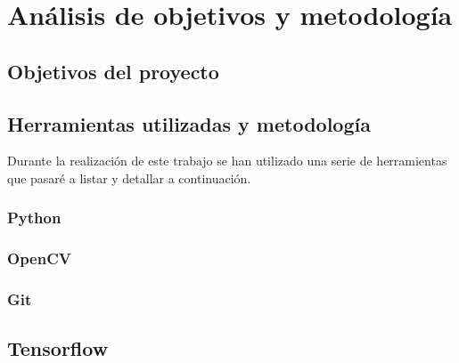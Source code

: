 \section{Análisis de objetivos y metodología}

\subsection{Objetivos del proyecto}

\subsection{Herramientas utilizadas y metodología}
Durante la realización de este trabajo se han utilizado una serie de herramientas que pasaré a listar y detallar a continuación.

\subsubsection*{Python}

\subsubsection*{OpenCV}

\subsubsection*{Git}

\subsection*{Tensorflow}

\newpage